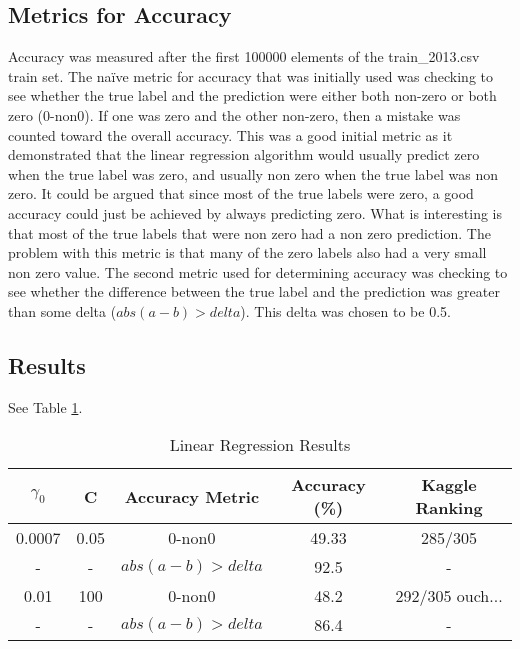 \documentclass[pdftex,a4paper,12pt]{article}
\begin{document}
\subsection{Metrics for Accuracy}
Accuracy was measured after the first 100000 elements of the train\_2013.csv train set. The na{\"i}ve metric for accuracy that was initially used was checking to see whether the true label and the prediction were either both non-zero or both zero (0-non0). If one was zero and the other non-zero, then a mistake was counted toward the overall accuracy. This was a good initial metric as it demonstrated that the linear regression algorithm would usually predict zero when the true label was zero, and usually non zero when the true label was non zero. It could be argued that since most of the true labels were zero, a good accuracy could just be achieved by always predicting zero. What is interesting is that most of the true labels that were non zero had a non zero prediction. The problem with this metric is that many of the zero labels also had a very small non zero value. The second metric used for determining accuracy was checking to see whether the difference between the true label and the prediction was greater than some delta ($abs(a - b) > delta$). This delta was chosen to be 0.5.
\subsection{Results}
See Table \ref{table:linAcc}.
  \begin{table}[h]
        {\centering
          \begin{tabular}{|c|c|c|c|c|}
            \hline
             $\gamma_0$ & C & Accuracy Metric & Accuracy (\%) & Kaggle Ranking\\
            \hline
                0.0007 &   0.05        & 0-non0 & 49.33 & 285/305 \\
             \hline
                - &   -        & $abs(a - b) > delta$ & 92.5 & - \\
                  \hline
                0.01 &  100         &  0-non0  & 48.2 & 292/305   ouch... \\
          \hline
                - &  -         & $abs(a - b) > delta$ & 86.4 & - \\
             \hline
          \end{tabular}
          \caption{Linear Regression Results}          
          \label{table:linAcc}}
  \end{table}
\end{document}
